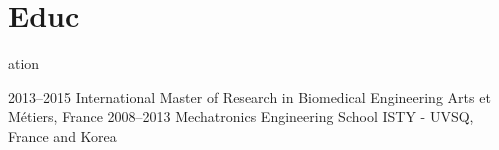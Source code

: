 \documentclass{cv-style}     %
\begin{document}

\section{Educ}{ation}

\begin{entrylist}
\entry
{2013--2015}
{International Master of Research in Biomedical Engineering} %
{Arts et Métiers, France}
{}
\entry
{2008--2013}
{Mechatronics Engineering School} %
{ISTY - UVSQ, France and Korea}
{}
\end{entrylist}
\end{document}
